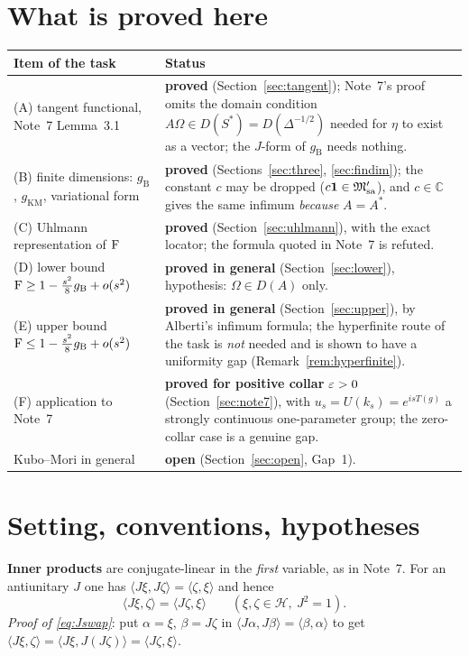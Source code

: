 \documentclass[11pt]{article}
\newcommand{\Om}{\Omega}
\newcommand{\Hil}{\mathcal H}
\newcommand{\Mpsa}{\cM'_{\mathrm{sa}}}
\newcommand{\gB}{g_{\mathrm B}}
\newcommand{\gKM}{g_{\mathrm{KM}}}
\newcommand{\ip}[2]{\langle #1,#2\rangle}
\newcommand{\one}{\mathbf 1}
\begin{document}
\tableofcontents

\section{What is proved here}\label{sec:overview}

\begin{center}\small
\begin{tabular}{@{}p{}p{}@{}}\toprule
\textbf{Item of the task} & \textbf{Status}\\\midrule
(A) tangent functional, Note~7 Lemma~3.1 & \textbf{proved} (Section~\ref{sec:tangent}); Note~7's proof omits the
domain condition $A\Om\in D(S^*)=D(\Delta^{-1/2})$ needed for $\eta$ to exist as a vector; the $J$-form of $\gB$ needs nothing.\\
(B) finite dimensions: $\gB$, $\gKM$, variational form & \textbf{proved} (Sections~\ref{sec:three}, \ref{sec:findim});
the constant $c$ may be dropped ($c\one\in\Mpsa$), and $c\in\mathbb C$ gives the same infimum \emph{because} $A=A^*$.\\
(C) Uhlmann representation of $\operatorname{F}$ & \textbf{proved} (Section~\ref{sec:uhlmann}), with the exact locator;
the formula quoted in Note~7 is refuted.\\
(D) lower bound $\Fid\ge1-\frac{s^2}8\gB+o(s^2)$ & \textbf{proved in general} (Section~\ref{sec:lower}), hypothesis: $\Om\in D(A)$ only.\\
(E) upper bound $\Fid\le1-\frac{s^2}8\gB+o(s^2)$ & \textbf{proved in general} (Section~\ref{sec:upper}), by Alberti's
infimum formula; the hyperfinite route of the task is \emph{not} needed and is shown to have a uniformity gap (Remark~\ref{rem:hyperfinite}).\\
(F) application to Note~7 & \textbf{proved for positive collar} $\varepsilon>0$ (Section~\ref{sec:note7}), with $u_s=U(k_s)=e^{isT(g)}$
a strongly continuous one-parameter group; the zero-collar case is a genuine gap.\\
Kubo--Mori in general & \textbf{open} (Section~\ref{sec:open}, Gap~1).\\\bottomrule
\end{tabular}
\end{center}

\section{Setting, conventions, hypotheses}\label{sec:setting}

\textbf{Inner products} are conjugate-linear in the \emph{first} variable, as in Note~7.  For an antiunitary $J$
one has $\ip{J\xi}{J\zeta}=\ip{\zeta}{\xi}$ and hence
\begin{equation}\label{eq:Jswap}
 \ip{J\xi}{\zeta}=\ip{J\zeta}{\xi}\qquad(\xi,\zeta\in\Hil,\ J^2=1).
\end{equation}
\emph{Proof of \eqref{eq:Jswap}}: put $\alpha=\xi$, $\beta=J\zeta$ in $\ip{J\alpha}{J\beta}=\ip{\beta}{\alpha}$ to get
$\ip{J\xi}{\zeta}=\ip{J\xi}{J(J\zeta)}=\ip{J\zeta}{\xi}$.
\end{document}
